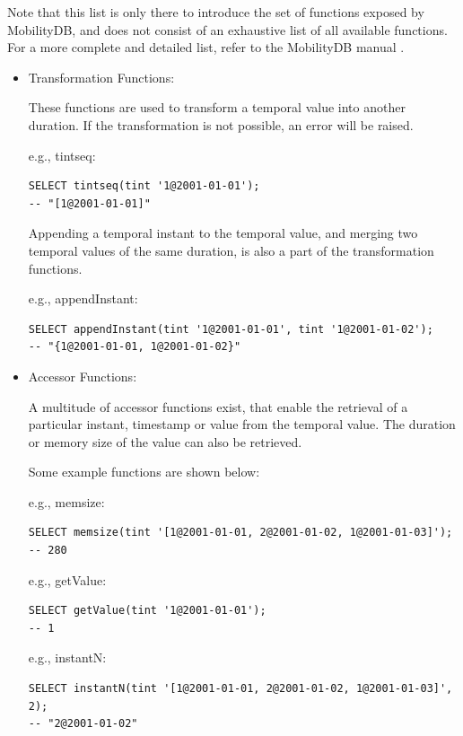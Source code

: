 Note that this list is only there to introduce the set of functions exposed by MobilityDB, and does not consist of an exhaustive list of all available functions. For a more complete and detailed list, refer to the MobilityDB manual \cite{mobiliydb_manual}.

\begin{itemize}
    \item Transformation Functions:

        These functions are used to transform a temporal value into another duration. If the transformation is not possible, an error will be raised. 

        e.g., tintseq:
        \begin{lstlisting}
SELECT tintseq(tint '1@2001-01-01');
-- "[1@2001-01-01]"
        \end{lstlisting}

        Appending a temporal instant to the temporal value, and merging two temporal values of the same duration, is also a part of the transformation functions.

        e.g., appendInstant:
        \begin{lstlisting}
SELECT appendInstant(tint '1@2001-01-01', tint '1@2001-01-02');
-- "{1@2001-01-01, 1@2001-01-02}"
        \end{lstlisting}

    \item Accessor Functions:

        A multitude of accessor functions exist, that enable the retrieval of a particular instant, timestamp or value from the temporal value. The duration or memory size of the value can also be retrieved.

        Some example functions are shown below:

        e.g., memsize:
        \begin{lstlisting}
SELECT memsize(tint '[1@2001-01-01, 2@2001-01-02, 1@2001-01-03]');
-- 280
        \end{lstlisting}

        e.g., getValue:
        \begin{lstlisting}
SELECT getValue(tint '1@2001-01-01');
-- 1
        \end{lstlisting}

        e.g., instantN:
        \begin{lstlisting}
SELECT instantN(tint '[1@2001-01-01, 2@2001-01-02, 1@2001-01-03]', 2);
-- "2@2001-01-02"
        \end{lstlisting}


\end{itemize}
